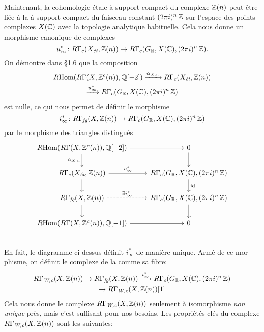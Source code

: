 \begin{otherlanguage}{french}
  Maintenant, la cohomologie étale à support compact du complexe $\mathbb{Z} (n)$ peut
  être liée à la  à support compact du
  faisceau constant $(2\pi i)^n\,\mathbb{Z}$ sur l'espace des points complexes $X (\mathbb{C})$
  avec la topologie analytique habituelle. Cela nous donne un morphisme canonique
  de complexes
  \[ u_\infty^*\colon R\Gamma_c (X_\text{\it ét}, \mathbb{Z} (n)) \to
    R\Gamma_c (G_{\mathbb{R}}, X (\mathbb{C}), (2\pi i)^n\,\mathbb{Z}). \]
  On démontre dans \S 1.6 que la composition
  \begin{multline*}
    R\!\operatorname{Hom} (R\Gamma (X, \mathbb{Z}^c (n)), \mathbb{Q} [-2]) \xrightarrow{\alpha_{X,n}}
    R\Gamma_c (X_\text{\it ét}, \mathbb{Z} (n)) \\
    \xrightarrow{u_\infty^*} R\Gamma_c (G_{\mathbb{R}}, X (\mathbb{C}), (2\pi i)^n\,\mathbb{Z})
  \end{multline*}
  est nulle, ce qui nous permet de définir le morphisme
  \[ i_\infty^*\colon R\Gamma_\text{\it fg} (X, \mathbb{Z} (n)) \to
    R\Gamma_c (G_{\mathbb{R}}, X (\mathbb{C}), (2\pi i)^n\,\mathbb{Z}) \]
  par le morphisme des triangles distingués
  \[ \begin{tikzcd}
      \RHom (R\Gamma (X, \ZZ^c (n)), \QQ [-2]) \ar{d}[swap]{\alpha_{X,n}}\ar{r} & 0\ar{d} \\
      R\Gamma_c (X_\text{\it ét}, \ZZ (n)) \ar{r}{u_\infty^*}\ar{d} & R\Gamma_c (G_\RR, X (\CC), (2\pi i)^n\,\ZZ) \ar{d}{\idid} \\
      R\Gamma_\text{\it fg} (X, \ZZ (n)) \ar[dashed]{r}{\exists i_\infty^*}\ar{d} & R\Gamma_c (G_\RR, X (\CC), (2\pi i)^n\,\ZZ) \ar{d} \\
      \RHom (R\Gamma (X, \ZZ^c (n)), \QQ [-1])\ar{r} & 0 \\
    \end{tikzcd} \]
  En fait, le diagramme ci-dessus définit $i_\infty^*$ de manière unique. Armé
  de ce morphisme, on définit le complexe de la
   comme sa fibre:
  \begin{multline*}
    R\Gamma_\text{\it W,c} (X,\mathbb{Z}(n)) \to
    R\Gamma_\text{\it fg} (X, \mathbb{Z} (n)) \xrightarrow{i_\infty^*}
    R\Gamma_c (G_{\mathbb{R}}, X (\mathbb{C}), (2\pi i)^n\,\mathbb{Z}) \\
    \to R\Gamma_\text{\it W,c} (X,\mathbb{Z}(n)) [1]
  \end{multline*}
  Cela nous donne le complexe $R\Gamma_\text{\it W,c} (X,\mathbb{Z}(n))$ seulement à
  isomorphisme \emph{non unique} près, mais c'est suffisant pour nos
  besoins. Les propriétés clés du complexe $R\Gamma_\text{\it W,c} (X,\mathbb{Z}(n))$
  sont les suivantes:


\end{otherlanguage}
